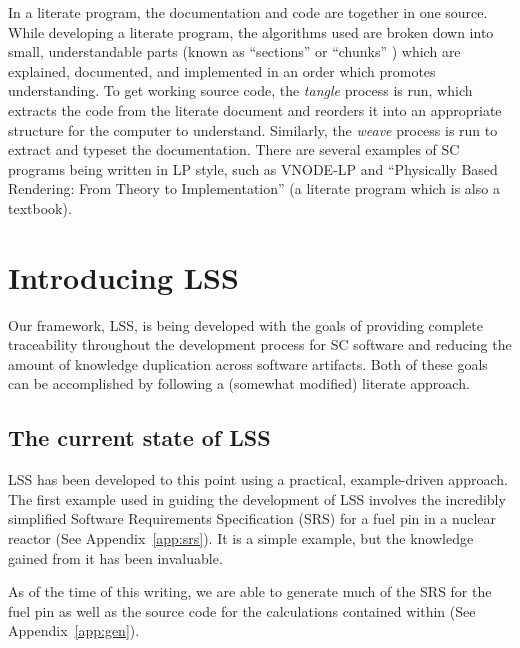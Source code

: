 \documentclass{sig-alternate-05-2015}
\newcommand{\lss}{LSS}
\begin{document}
In a literate program, the documentation and code are together in one source.
While developing a literate program, the algorithms used are broken down into
small, understandable parts (known as ``sections'' \cite{Knuth1984} or
``chunks'' \cite{JohnsonAndJohnson1997}) which are explained, documented, and
implemented in an order which promotes understanding. To get working
source code, the \textit{tangle} process is run, which extracts the code from
the literate document and reorders it into an appropriate structure for the
computer to understand. Similarly, the \textit{weave} process is run to
extract and typeset the documentation.
There are several examples of SC
programs being written in LP style, such as VNODE-LP
\cite{Nedialkov2006} and ``Physically Based Rendering: From Theory to
Implementation'' \cite{PharrAndHumphreys2004} (a literate program which is also
a textbook).

\section{Introducing \lss} \label{sec:lss} %

Our framework, \lss, is being developed with the goals of providing complete
traceability throughout the development process for SC software and reducing the
amount of knowledge duplication across software artifacts. Both of these goals
can be accomplished by following a (somewhat modified) literate approach.

\subsection{The current state of \lss} \label{ssec:example}

\lss{} has been developed to this point using a practical, example-driven
approach. The first example used in guiding the development of \lss{} involves
the incredibly simplified Software Requirements Specification (SRS) for a fuel
pin in a nuclear reactor (See Appendix~\ref{app:srs}). It is a simple
example, but the knowledge gained from it has been invaluable.

As of the time of this writing, we are able to generate much of the SRS for the
fuel pin as well as the source code for the calculations contained within
(See Appendix~\ref{app:gen}).
\end{document}

